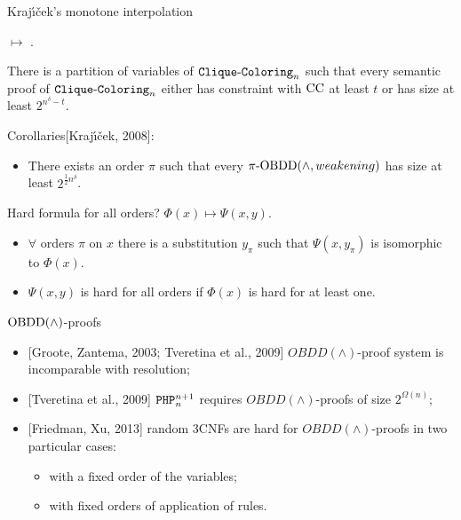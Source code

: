 \begin{frame}{Kraj{\'{\i}}{\v{c}}ek's monotone interpolation}

     $\mapsto$
    .

    \pause

    \begin{theorem}[Kraj{\'{\i}}{\v{c}}ek, 1998]
        There is a partition of variables of $\mathtt{Clique\text{-}Coloring}_n$ such that every semantic proof of $\mathtt{Clique\text{-}Coloring}_n$
        either has constraint with $\mathrm{CC}$ at least $t$ or has size at least $2^{n^{\delta} - t}$. 
    \end{theorem}

    \pause

    Corollaries[Kraj{\'{\i}}{\v{c}}ek, 2008]:
    \begin{itemize}
        \item There exists an order $\pi$ such that every $\pi\text{-}\mathrm{OBDD}(\land,
            weakening)$ has size at least $2^{\frac{1}{2} n^\delta}$.
    \end{itemize}

    \pause
    Hard formula for all orders? \pause $\Phi(x) \mapsto \Psi(x, y)$.
    
    \begin{itemize}
        \item $\forall$ orders $\pi$ on $x$ there is a substitution $y_{\pi}$ such that $\Psi(x,
            y_{\pi})$ is isomorphic to $\Phi(x)$.
        \item $\Psi(x, y)$ is hard for all orders if $\Phi(x)$ is hard for at least one.
    \end{itemize}
\end{frame}

\begin{frame}{$\mathrm{OBDD}(\land)$-proofs}
    \begin{itemize}
        \item{} [Groote, Zantema, 2003; Tveretina et al., 2009] $OBDD(\land)$-proof system is
            incomparable with resolution;
        \item{} [Tveretina et al., 2009] $\mathtt{PHP}^{n + 1}_n$ requires $OBDD(\land)$-proofs of size
            $2^{\Omega(n)}$;
        \item{} [Friedman, Xu, 2013] random $3$CNFs are hard for $OBDD(\land)$-proofs in two particular
            cases:
            \begin{itemize}
                \item with a fixed order of the variables;
                \item with fixed orders of application of rules.
            \end{itemize}
    \end{itemize}    
\end{frame}


